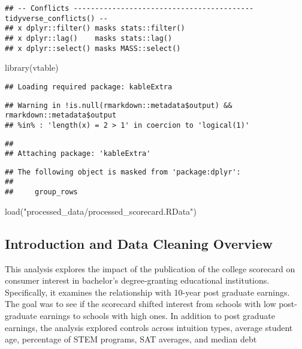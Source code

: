 \documentclass[
]{article}
\newenvironment{Shaded}{\begin{snugshade}}{\end{snugshade}}
\newcommand{\FunctionTok}[1]{\textcolor[rgb]{0.00,0.00,0.00}{#1}}
\newcommand{\NormalTok}[1]{#1}
\newcommand{\StringTok}[1]{\textcolor[rgb]{0.31,0.60,0.02}{#1}}
\begin{document}
\begin{verbatim}
## -- Conflicts ------------------------------------------ tidyverse_conflicts() --
## x dplyr::filter() masks stats::filter()
## x dplyr::lag()    masks stats::lag()
## x dplyr::select() masks MASS::select()
\end{verbatim}

\begin{Shaded}
\begin{Highlighting}[]
\FunctionTok{library}\NormalTok{(vtable)}
\end{Highlighting}
\end{Shaded}

\begin{verbatim}
## Loading required package: kableExtra
\end{verbatim}

\begin{verbatim}
## Warning in !is.null(rmarkdown::metadata$output) && rmarkdown::metadata$output
## %in% : 'length(x) = 2 > 1' in coercion to 'logical(1)'
\end{verbatim}

\begin{verbatim}
## 
## Attaching package: 'kableExtra'
\end{verbatim}

\begin{verbatim}
## The following object is masked from 'package:dplyr':
## 
##     group_rows
\end{verbatim}

\begin{Shaded}
\begin{Highlighting}[]
\FunctionTok{load}\NormalTok{(}\StringTok{"processed\_data/processed\_scorecard.RData"}\NormalTok{)}
\end{Highlighting}
\end{Shaded}

\hypertarget{introduction-and-data-cleaning-overview}{%
\subsection{Introduction and Data Cleaning
Overview}\label{introduction-and-data-cleaning-overview}}

This analysis explores the impact of the publication of the college
scorecard on consumer interest in bachelor's degree-granting educational
institutions. Specifically, it examines the relationship with 10-year
post graduate earnings. The goal was to see if the scorecard shifted
interest from schools with low post-graduate earnings to schools with
high ones. In addition to post graduate earnings, the analysis explored
controls across intuition types, average student age, percentage of STEM
programs, SAT averages, and median debt
\end{document}
